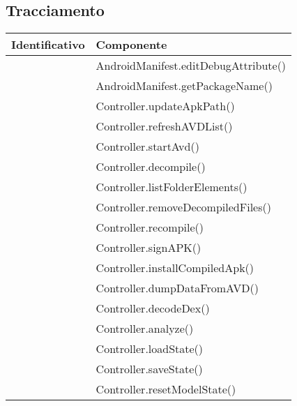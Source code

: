 \subsection{Tracciamento}\label{subsec:tracciamento}
\begin{center}
    \begin{longtable}{ |C{3cm} |C{10.5cm}|}
        \hline
        \textbf{Identificativo} & \textbf{Componente}                        \\\hline
                     & AndroidManifest.editDebugAttribute()       \\\hline
                     & AndroidManifest.getPackageName()           \\\hline
                     & Controller.updateApkPath()                 \\\hline
                     & Controller.refreshAVDList()                \\\hline
                     & Controller.startAvd()                      \\\hline
                     & Controller.decompile()                     \\\hline
                     & Controller.listFolderElements()            \\\hline
                     & Controller.removeDecompiledFiles()         \\\hline
                     & Controller.recompile()                     \\\hline
                     & Controller.signAPK()                       \\\hline
                     & Controller.installCompiledApk()            \\\hline
                     & Controller.dumpDataFromAVD()               \\\hline
                     & Controller.decodeDex()                     \\\hline
                     & Controller.analyze()                       \\\hline
                     & Controller.loadState()                     \\\hline
                     & Controller.saveState()                     \\\hline
                     & Controller.resetModelState()               \\\hline

\end{longtable}
\end{center}
